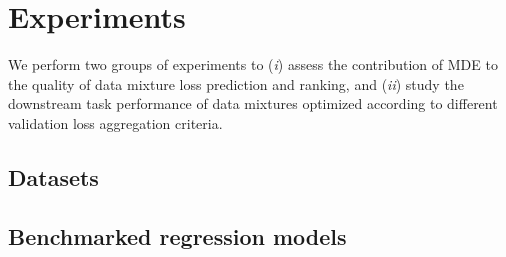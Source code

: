 \section{Experiments}
\label{sec:experiments}
 We perform two groups of experiments to (\textit{i}) assess the contribution of MDE to the quality of data mixture loss prediction and ranking, and (\textit{ii}) study the downstream task performance of data mixtures optimized according to different validation loss aggregation criteria. 

\subsection{Datasets}
\label{sec:data}


\subsection{Benchmarked regression models}


